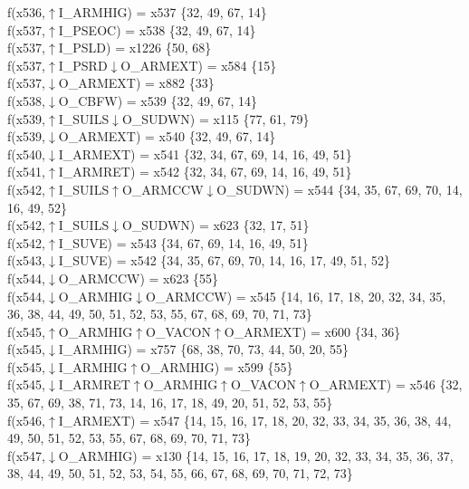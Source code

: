 f(x536,$\uparrow$I\_ARMHIG) = x537 \{32, 49, 67, 14\} \\  
f(x537,$\uparrow$I\_PSEOC) = x538 \{32, 49, 67, 14\} \\  
f(x537,$\uparrow$I\_PSLD) = x1226 \{50, 68\} \\  
f(x537,$\uparrow$I\_PSRD$\downarrow$O\_ARMEXT) = x584 \{15\} \\  
f(x537,$\downarrow$O\_ARMEXT) = x882 \{33\} \\  
f(x538,$\downarrow$O\_CBFW) = x539 \{32, 49, 67, 14\} \\  
f(x539,$\uparrow$I\_SUILS$\downarrow$O\_SUDWN) = x115 \{77, 61, 79\} \\  
f(x539,$\downarrow$O\_ARMEXT) = x540 \{32, 49, 67, 14\} \\  
f(x540,$\downarrow$I\_ARMEXT) = x541 \{32, 34, 67, 69, 14, 16, 49, 51\} \\  
f(x541,$\uparrow$I\_ARMRET) = x542 \{32, 34, 67, 69, 14, 16, 49, 51\} \\  
f(x542,$\uparrow$I\_SUILS$\uparrow$O\_ARMCCW$\downarrow$O\_SUDWN) = x544 \{34, 35, 67, 69, 70, 14, 16, 49, 52\} \\  
f(x542,$\uparrow$I\_SUILS$\downarrow$O\_SUDWN) = x623 \{32, 17, 51\} \\  
f(x542,$\uparrow$I\_SUVE) = x543 \{34, 67, 69, 14, 16, 49, 51\} \\  
f(x543,$\downarrow$I\_SUVE) = x542 \{34, 35, 67, 69, 70, 14, 16, 17, 49, 51, 52\} \\  
f(x544,$\downarrow$O\_ARMCCW) = x623 \{55\} \\  
f(x544,$\downarrow$O\_ARMHIG$\downarrow$O\_ARMCCW) = x545 \{14, 16, 17, 18, 20, 32, 34, 35, 36, 38, 44, 49, 50, 51, 52, 53, 55, 67, 68, 69, 70, 71, 73\} \\  
f(x545,$\uparrow$O\_ARMHIG$\uparrow$O\_VACON$\uparrow$O\_ARMEXT) = x600 \{34, 36\} \\  
f(x545,$\downarrow$I\_ARMHIG) = x757 \{68, 38, 70, 73, 44, 50, 20, 55\} \\  
f(x545,$\downarrow$I\_ARMHIG$\uparrow$O\_ARMHIG) = x599 \{55\} \\  
f(x545,$\downarrow$I\_ARMRET$\uparrow$O\_ARMHIG$\uparrow$O\_VACON$\uparrow$O\_ARMEXT) = x546 \{32, 35, 67, 69, 38, 71, 73, 14, 16, 17, 18, 49, 20, 51, 52, 53, 55\} \\  
f(x546,$\uparrow$I\_ARMEXT) = x547 \{14, 15, 16, 17, 18, 20, 32, 33, 34, 35, 36, 38, 44, 49, 50, 51, 52, 53, 55, 67, 68, 69, 70, 71, 73\} \\  
f(x547,$\downarrow$O\_ARMHIG) = x130 \{14, 15, 16, 17, 18, 19, 20, 32, 33, 34, 35, 36, 37, 38, 44, 49, 50, 51, 52, 53, 54, 55, 66, 67, 68, 69, 70, 71, 72, 73\} \\  
